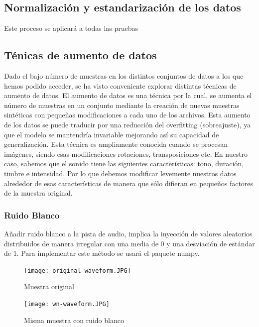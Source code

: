 \documentclass[11pt,a4paper,spanish]{book}
\begin{document}
	
	\subsection{Normalización y estandarización de los datos}
	\label{cap:normalizacion}
	Este proceso se aplicará a todas las pruebas

	
	
	\subsection{Ténicas de aumento de datos}
	Dado el bajo número de muestras en los distintos conjuntos de datos a los que hemos podido acceder, se ha visto conveniente explorar distintas técnicas de aumento de datos. El aumento de datos es una técnica por la cual, se aumenta el número de muestras en un conjunto mediante la creación de nuevas muestras sintéticas con pequeñas modificaciones a cada uno de los archivos. Esta aumento de los datos se puede traducir por una reducción del overfitting (sobreajuste), ya que el modelo se mantendría invariable mejorando así su capacidad de generalización.
	Esta técnica es ampliamente conocida cuando se procesan imágenes, siendo esas modificaciones rotaciones, transposiciones etc. En nuestro caso, sabemos que el sonido tiene las siguientes características: tono, duración, timbre e intensidad. Por lo que debemos modificar levemente nuestros datos alrededor de esas características de manera que sólo difieran en pequeños factores de la muestra original.
	
		\subsubsection{Ruido Blanco}
		Añadir ruido blanco a la pista de audio, implica la inyección de valores aleatorios distribuidos de manera irregular con una media de 0 y una desviación de estándar de 1. Para implementar este método se usará el paquete numpy.
		
		\begin{figure}[!htb]
			\begin{minipage}{0.45\textwidth}
				\centering
				\texttt{[image: original-waveform.JPG]}
				\caption{Muestra original}
				\label{ref:audio_original_1}
			\end{minipage}\hfill 
			\begin{minipage}{0.45\textwidth}
				\centering
				\texttt{[image: wn-waveform.JPG]}\hfill
				\caption{Misma muestra con ruido blanco}
				\label{ref:audio_wn}
			\end{minipage}
		\end{figure}
				
\end{document}
